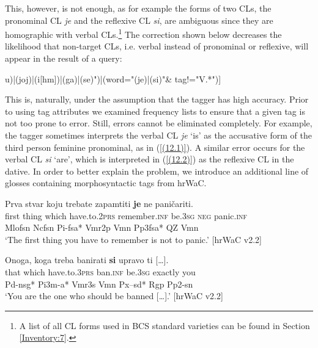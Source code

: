 This, however, is not enough, as for example the forms of two CLs, the pronominal CL \textit{je} and the reflexive CL \textit{si}, are ambiguous since they are homographic with verbal CLs.\footnote{A list of all CL forms used in BCS standard varieties can be found in Section \ref{Inventory:7}.} The correction shown below decreases the likelihood that non-target CLs, i.e. verbal instead of pronominal or reflexive, will appear in the result of a query:


\noindent\begin{verbatim*}
[(word="([mj]u)|(joj)|(i[hm])|(ga)|(se)")|(word="(je)|(si)"&
tag!="V.*")]
\end{verbatim*}


\noindent This is, naturally, under the assumption that the tagger has high accuracy. Prior to using tag attributes we examined frequency lists to ensure that a given tag is not too prone to error. Still, errors cannot be eliminated completely. For example, the tagger sometimes interprets the verbal CL \textit{je} ‘is’ as the accusative form of the third person feminine pronominal, as in (\ref{(12.1)}). A similar error occurs for the verbal CL \textit{si} ‘are’, which is interpreted in (\ref{(12.2)}) as the reflexive CL in the dative. In order to better explain the problem, we introduce an additional line of glosses containing morphosyntactic tags from hrWaC.

\begin{exe}\ex\label{(12.1)}
\glll Prva stvar koju trebate zapamtiti \textbf{je} ne paničariti.\\
 first thing which have.to.\textsc{2prs} remember.\textsc{inf} be.\textsc{3sg} \textsc{neg} panic.\textsc{inf} \\
 Mlofsn Ncfsn Pi-fsa* Vmr2p Vmn Pp3fsa* QZ Vmn \\
\glt ‘The first thing you have to remember is not to panic.’
\hfill [hrWaC v2.2]

\ex\label{(12.2)}
\glll Onoga, koga treba banirati \textbf{si} upravo {ti [\dots].} \\
 that which have.to.\textsc{3prs} ban.\textsc{inf} be.\textsc{3sg} exactly you\\
 Pd-nsg* Pi3m-a* Vmr3s Vmn Px--sd* Rgp Pp2-sn \\
\glt ‘You are the one who should be banned [\dots].’
\hfill  [hrWaC v2.2]
\end{exe}

